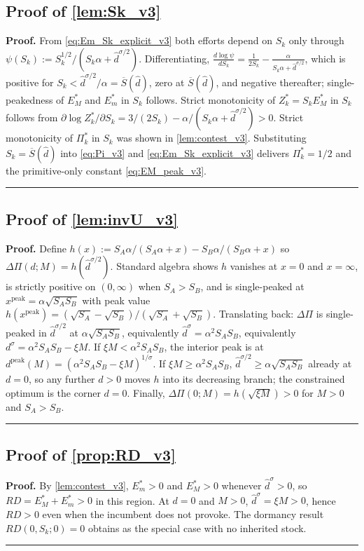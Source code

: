 \documentclass[11pt,twoside]{extarticle}
\newenvironment{proof}[1][Proof]{\noindent \textbf{#1.} }{\ \rule{0.5em}{0.5em}}
\begin{document}
\subsection*{Proof of \autoref{lem:Sk_v3}} \label{app:proof:Sk_v3}
\begin{proof}
From \autoref{eq:Em_Sk_explicit_v3} both efforts depend on $S_k$ only through $\psi(S_k):=S_k^{1/2}/(S_k\alpha+\hat d^{\sigma/2})$. Differentiating, $\frac{d\log\psi}{dS_k}=\frac{1}{2S_k}-\frac{\alpha}{S_k\alpha+\hat d^{\sigma/2}}$, which is positive for $S_k<\hat d^{\sigma/2}/\alpha=\overline S(\hat d)$, zero at $\overline S(\hat d)$, and negative thereafter; single-peakedness of $E_M^*$ and $E_m^*$ in $S_k$ follows. Strict monotonicity of $Z_k^*=S_kE_M^*$ in $S_k$ follows from $\partial\log Z_k^*/\partial S_k=3/(2S_k)-\alpha/(S_k\alpha+\hat d^{\sigma/2})>0$. Strict monotonicity of $\Pi_k^*$ in $S_k$ was shown in \autoref{lem:contest_v3}. Substituting $S_k=\overline S(\hat d)$ into \autoref{eq:Pi_v3} and \autoref{eq:Em_Sk_explicit_v3} delivers $\Pi_k^*=1/2$ and the primitive-only constant \autoref{eq:EM_peak_v3}.
\end{proof}

\subsection*{Proof of \autoref{lem:invU_v3}} \label{app:proof:invU_v3}
\begin{proof}
Define $h(x):=S_A\alpha/(S_A\alpha+x)-S_B\alpha/(S_B\alpha+x)$ so $\Delta\Pi(d;M)=h(\hat d^{\sigma/2})$. Standard algebra shows $h$ vanishes at $x=0$ and $x=\infty$, is strictly positive on $(0,\infty)$ when $S_A>S_B$, and is single-peaked at $x^{\mathrm{peak}}=\alpha\sqrt{S_A S_B}$ with peak value $h(x^{\mathrm{peak}})=(\sqrt{S_A}-\sqrt{S_B})/(\sqrt{S_A}+\sqrt{S_B})$. Translating back: $\Delta\Pi$ is single-peaked in $\hat d^{\sigma/2}$ at $\alpha\sqrt{S_A S_B}$, equivalently $\hat d^\sigma=\alpha^2 S_A S_B$, equivalently $d^\sigma=\alpha^2 S_A S_B-\xi M$. If $\xi M<\alpha^2 S_A S_B$, the interior peak is at $d^{\mathrm{peak}}(M)=(\alpha^2 S_A S_B-\xi M)^{1/\sigma}$. If $\xi M\ge\alpha^2 S_A S_B$, $\hat d^{\sigma/2}\ge\alpha\sqrt{S_A S_B}$ already at $d=0$, so any further $d>0$ moves $h$ into its decreasing branch; the constrained optimum is the corner $d=0$. Finally, $\Delta\Pi(0;M)=h(\sqrt{\xi M})>0$ for $M>0$ and $S_A>S_B$.
\end{proof}

\subsection*{Proof of \autoref{prop:RD_v3}} \label{app:proof:RD_v3}
\begin{proof}
By \autoref{lem:contest_v3}, $E_m^*>0$ and $E_M^*>0$ whenever $\hat d^\sigma>0$, so $RD=E_M^*+E_m^*>0$ in this region. At $d=0$ and $M>0$, $\hat d^\sigma=\xi M>0$, hence $RD>0$ even when the incumbent does not provoke. The dormancy result $RD(0,S_k;0)=0$ obtains as the special case with no inherited stock.
\end{proof}
\end{document}

